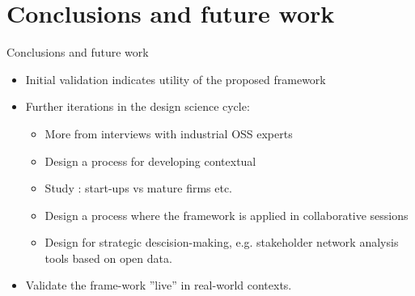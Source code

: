 \documentclass{slideclass}
\begin{document}
\section{Conclusions and future work}
\begin{Slide}{Conclusions and future work}
\begin{itemize}
\item Initial validation indicates utility of the proposed framework 
\item Further iterations in the design science cycle:
\begin{itemize}
\item More  from interviews with industrial OSS experts
\item Design a process for developing contextual 
\item Study : start-ups vs mature firms etc.
\item Design a  process where the framework is applied in collaborative sessions
\item Design  for strategic descision-making, e.g. stakeholder network analysis tools based on open data.
\end{itemize}
\item Validate the frame-work ''live'' in real-world contexts.
\end{itemize}

\end{Slide}

\bgroup
{}
\begin{frame}[plain]{}
\begin{center}
\Huge{}
\end{center}
\end{frame}
\egroup
\end{document}
